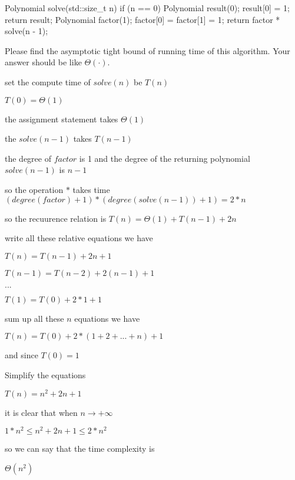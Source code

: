 \begin{parts}
	\begin{cpp}
Polynomial solve(std::size_t n) {
  if (n == 0) {
    Polynomial result(0);
    result[0] = 1;
    return result;
  }
  Polynomial factor(1);
  factor[0] = factor[1] = 1;
  return factor * solve(n - 1);
}
	\end{cpp}

	Please find the asymptotic tight bound of running time of this algorithm. Your answer should be like \(\Theta(\cdot)\).
	\begin{solution}
		set the compute time of \(solve(n)\) be  \(T(n)\)

    \(T(0) = \Theta(1)\)

    the assignment statement takes \(\Theta(1)\)

    the \(solve(n-1)\) takes \(T(n-1)\)

    the degree of \(factor\) is 1 and the degree of the returning polynomial \(solve(n-1)\) is \(n-1\)

    so the operation \(*\) takes time \((degree(factor)+1)*(degree(solve(n-1))+1)=2*n\)

    so the recuurence relation is \(T(n)=\Theta(1)+T(n-1)+2n\)

    write all these relative equations we have

    \(T(n)=T(n-1)+2n+1\)

    \(T(n-1)=T(n-2)+2(n-1)+1\)

    \(...\)

    \(T(1)=T(0)+2*1+1\)

    sum up all these \(n\) equations we have
    
    \(T(n)=T(0)+2*(1+2+...+n)+1\)

    and since \(T(0)=1\)

    Simplify the equations
    
    \(T(n)=n^2+2n+1\)

    it is clear that when \(n \to +\infty\)

    \(1*n^2 \leq n^2+2n+1 \leq 2*n^2\)

    so we can say that the time complexity is 

    \( \Theta(n^2)\)
	\end{solution}

  \newpage


\end{parts}
